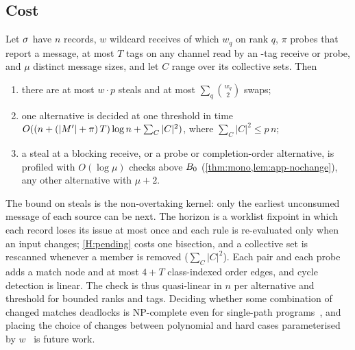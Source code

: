 \subsection{Cost}
\label{sec:cost}

\begin{theorem}[Cost]
\label{thm:cost}
Let $\sigma$ have $n$ records, $w$ wildcard receives of which $w_q$ on rank $q$, $\pi$ probes
that report a message, at most $T$ tags on any channel read by an \ANY-tag receive or probe,
and $\mu$ distinct message sizes, and let $C$ range over its collective sets. Then
\begin{enumerate}[leftmargin=*,label=(\roman*)]
\item there are at most $w\cdot p$ steals and at most $\sum_q \binom{w_q}{2}$ swaps;
\item one alternative is decided at one threshold in time
  $O((n+(|M'|+\pi)\,T)\log n+\sum_C|C|^2)$, where $\sum_C|C|^2\le p\,n$;
\item a steal at a blocking receive, or a probe or completion-order alternative, is profiled
  with $O(\log \mu)$ checks above $B_0$ (\cref{thm:mono,lem:app-nochange}), any other
  alternative with $\mu+2$.
\end{enumerate}
\end{theorem}

\noindent The bound on steals is the non-overtaking kernel: only the earliest unconsumed
message of each source can be next. The horizon is a worklist fixpoint in which each record
loses its issue at most once and each rule is re-evaluated only when an input changes;
\ref{H:pending} costs one bisection, and a collective set is rescanned whenever a member is
removed ($\sum_C|C|^2$). Each pair and each probe adds a match node and at most $4+T$
class-indexed order edges, and cycle detection is linear. The check is thus quasi-linear in
$n$ per alternative and threshold for bounded ranks and tags.
Deciding whether some combination of
changed matches deadlocks is NP-complete even for single-path programs~\citep{forejt17mopper},
and placing the choice of changes between polynomial and hard cases parameterised by
$w$~\citep{shi26popl,mathur20lics,kulkarni21concur} is future work.
